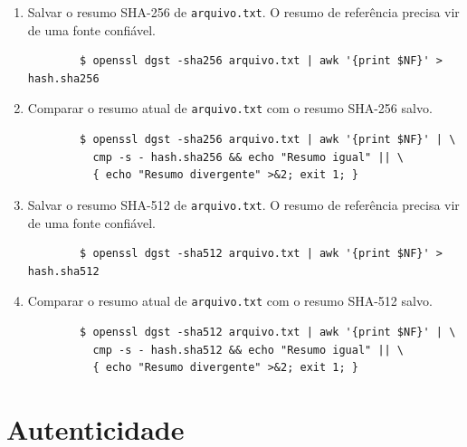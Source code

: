 \documentclass{article}
\begin{document}
\begin{enumerate}
	\item Salvar o resumo SHA-256 de \texttt{arquivo.txt}. O resumo de referência precisa vir de uma fonte confiável.
	\begin{tcolorbox}[width=\textwidth]
	{\small
		\begin{verbatim}
		$ openssl dgst -sha256 arquivo.txt | awk '{print $NF}' > hash.sha256
		\end{verbatim}
	}
	\end{tcolorbox}

	\item Comparar o resumo atual de \texttt{arquivo.txt} com o resumo SHA-256 salvo.
	\begin{tcolorbox}[width=\textwidth]
	{\small
		\begin{verbatim}
		$ openssl dgst -sha256 arquivo.txt | awk '{print $NF}' | \
		  cmp -s - hash.sha256 && echo "Resumo igual" || \
		  { echo "Resumo divergente" >&2; exit 1; }
		\end{verbatim}
	}
	\end{tcolorbox}

	\item Salvar o resumo SHA-512 de \texttt{arquivo.txt}. O resumo de referência precisa vir de uma fonte confiável.
	\begin{tcolorbox}[width=\textwidth]
	{\small
		\begin{verbatim}
		$ openssl dgst -sha512 arquivo.txt | awk '{print $NF}' > hash.sha512
		\end{verbatim}
	}
	\end{tcolorbox}

	\item Comparar o resumo atual de \texttt{arquivo.txt} com o resumo SHA-512 salvo.
	\begin{tcolorbox}[width=\textwidth]
	{\small
		\begin{verbatim}
		$ openssl dgst -sha512 arquivo.txt | awk '{print $NF}' | \
		  cmp -s - hash.sha512 && echo "Resumo igual" || \
		  { echo "Resumo divergente" >&2; exit 1; }
		\end{verbatim}
	}
	\end{tcolorbox}
\end{enumerate}

\pagebreak

\section{Autenticidade}
\end{document}
